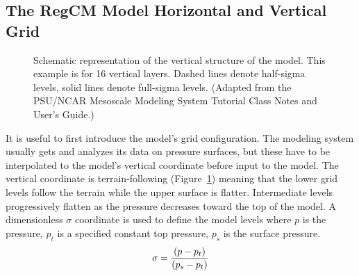 \subsection{The \ac{RegCM} Model Horizontal and Vertical Grid} \begin{figure}
 \caption{Schematic
representation of the vertical structure of the model.  This example is for 16
vertical layers.  Dashed lines denote half-sigma levels, solid lines denote
full-sigma levels. (Adapted from the PSU/NCAR Mesoscale Modeling System Tutorial
Class Notes and User's Guide.)}  \label{sigma_levels} \end{figure}

It is useful to first introduce the model's grid configuration. The modeling
system usually gets and analyzes its data on pressure surfaces, but these have
to be interpolated to the model's vertical coordinate before input to the model.
The vertical coordinate is terrain-following (Figure~\ref{sigma_levels}) meaning
that the lower grid levels follow the terrain while the upper surface is
flatter. Intermediate levels progressively flatten as the pressure decreases
toward the top of the model. A dimensionless $\sigma$ coordinate is used to
define the model levels where $p$ is the pressure, $p_t$ is a specified constant
top pressure, $p_s$ is the surface pressure.  \begin{eqnarray} \sigma = {(p -
p_t) \over (p_s - p_t)} \end{eqnarray}

